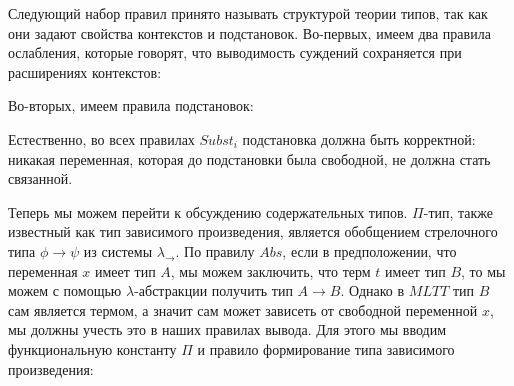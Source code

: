 \documentclass{article}[12pt]
\begin{document}
Следующий набор правил принято называть структурой теории типов, так как они задают свойства контекстов
и подстановок. Во-первых, имеем два правила ослабления, которые говорят, что выводимость суждений
сохраняется при расширениях контекстов:
\begin{multicols}{2}
    \begin{prooftree}
    \end{prooftree}
    \begin{prooftree}
    \end{prooftree}
\end{multicols}
Во-вторых, имеем правила подстановок:
\begin{multicols}{2}
    \begin{prooftree}
    \end{prooftree}
    \begin{prooftree}
    \end{prooftree}
\end{multicols}
\begin{prooftree}
\end{prooftree}
Естественно, во всех правилах $Subst_i$ подстановка должна быть корректной: никакая переменная, которая до
подстановки была свободной, не должна стать связанной. 

Теперь мы можем перейти к обсуждению содержательных типов. $\Pi$-тип, также известный как тип зависимого
произведения, является обобщением стрелочного типа $\phi \rightarrow \psi$ из системы $\lambda_\rightarrow$.
По правилу $Abs$, если в предположении, что переменная $x$ имеет тип $A$, мы можем заключить, что терм $t$
имеет тип $B$, то мы можем с помощью $\lambda$-абстракции получить тип $A \rightarrow B$. Однако в $MLTT$
тип $B$ сам является термом, а значит сам может зависеть от свободной переменной $x$, мы должны учесть это
в наших правилах вывода. Для этого мы вводим функциональную константу $\Pi$ и правило формирование типа
зависимого произведения:
\begin{prooftree}
\end{prooftree}
\end{document}
